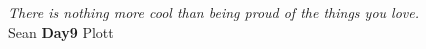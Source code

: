 \textit{There is nothing more cool than being proud of the things you love.} \\
\raggedleft
Sean \textbf{Day9} Plott
